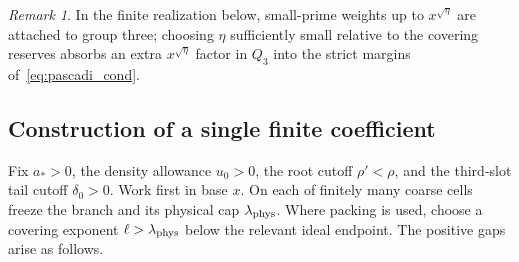 \documentclass[11pt,reqno]{amsart}
\theoremstyle{remark}
\newtheorem{remark}[theorem]{Remark}
\numberwithin{equation}{section}
\begin{document}
\begin{remark}
In the finite realization below, small-prime weights up to $x^{\sqrt{\eta}}$ are attached to group three; choosing $\eta$ sufficiently small relative to the covering reserves absorbs an extra $x^{\sqrt{\eta}}$ factor in $Q_3$ into the strict margins of~\eqref{eq:pascadi_cond}.
\end{remark}

\subsection{Construction of a single finite coefficient}
Fix $a_*>0$, the density allowance $u_0>0$, the root cutoff $\rho'<\rho$, and the third-slot tail cutoff $\delta_0>0$. Work first in base $x$. On each of finitely many coarse cells freeze the branch and its physical cap $\lambda_{\rm phys}$. Where packing is used, choose a covering exponent $\ell>\lambda_{\rm phys}$ below the relevant ideal endpoint. The positive gaps arise as follows.
\end{document}
